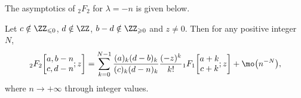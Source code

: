 The asymptotics of $_2F_2$ for $\lambda=-n$ is given below.
\begin{Theorem}\label{Thm: 2F2 large parameter--n}
	Let $c\notin\ZZ_{\leqslant 0}$, $d\notin\ZZ$, $b-d\notin\ZZ_{\geqslant 0}$ and $z\ne 0$. Then for any positive integer $N$,
	\begin{equation}\label{2F2 large parameter--n}
		{}_2F_2\biggl[\begin{matrix}
			a,b-n\\
			c,d-n
		\end{matrix};z\biggr]=\sum_{k=0}^{N-1}\frac{(a)_k(d-b)_k}{(c)_k(d-n)_k}\frac{(-z)^k}{k!}{}_1F_1\biggl[\begin{matrix}
			a+k\\
			c+k
		\end{matrix};z\biggr]+\mo\big(n^{-N}\big),
	\end{equation}
	where $n\to +\infty$ through integer values.
\end{Theorem}

